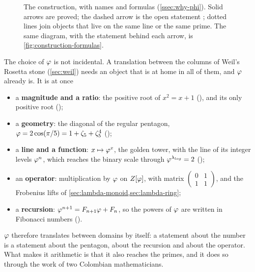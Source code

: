 \begin{figure}[ht]
\caption{The construction, with names and formulas (\cref{ssec:why-phi}).  Solid arrows are proved; the dashed arrow is the open
statement \Ecore; dotted lines join objects that live on the same line or the same prime.  The same diagram, with
the statement behind each arrow, is \cref{fig:construction-formulas}.}
\label{fig:construction-words}
\end{figure}


The choice of $\varphi$ is not incidental.  A translation between the columns of
Weil's Rosetta stone (\cref{sec:weil}) needs an object that is at home in all of
them, and $\varphi$ already is.  It is at once
\begin{itemize}
  \item a \textbf{magnitude and a ratio}: the positive root of $x^2=x+1$
    (), and its only positive root
    ();
  \item a \textbf{geometry}: the diagonal of the regular pentagon,
    $\varphi=2\cos(\pi/5)=1+\zeta_5+\zeta_5^4$
    ();
  \item a \textbf{line and a function}: $x\mapsto\varphi^x$, the golden tower, with the line of its integer
    levels $\varphi^n$, which reaches
    the binary scale through $\varphi^{\lambda_{log}}=2$
    ();
  \item an \textbf{operator}: multiplication by $\varphi$ on $Z[\varphi]$, with matrix
    $\left(\begin{smallmatrix}0&1\\1&1\end{smallmatrix}\right)$, and the
    Frobenius lifts of \cref{sec:lambda-monoid,sec:lambda-ring};
  \item a \textbf{recursion}: $\varphi^{n+1}=F_{n+1}\varphi+F_n$, so the powers of
    $\varphi$ are written in Fibonacci numbers ().
\end{itemize}
$\varphi$ therefore translates between domains by itself: a statement about the
number is a statement about the pentagon, about the recursion and about the
operator.  What makes it arithmetic is that it also reaches the primes, and it
does so through the work of two Colombian mathematicians.

